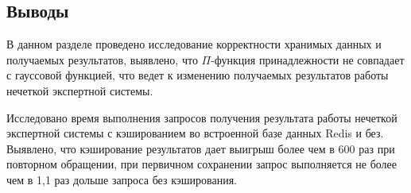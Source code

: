 \subsection{Выводы}
В данном разделе проведено исследование корректности хранимых данных и получаемых результатов, выявлено, что $\Pi$-функция принадлежности не совпадает с гауссовой функцией, что ведет к изменению получаемых результатов работы нечеткой экспертной системы. 

Исследовано время выполнения запросов получения результата работы нечеткой экспертной системы с кэшированием во встроенной базе данных Redis и без. Выявлено, что кэширование результатов дает выигрыш более чем в 600 раз при повторном обращении, при первичном сохранении запрос выполняется не более чем в 1,1 раз дольше запроса без кэширования.

\pagebreak